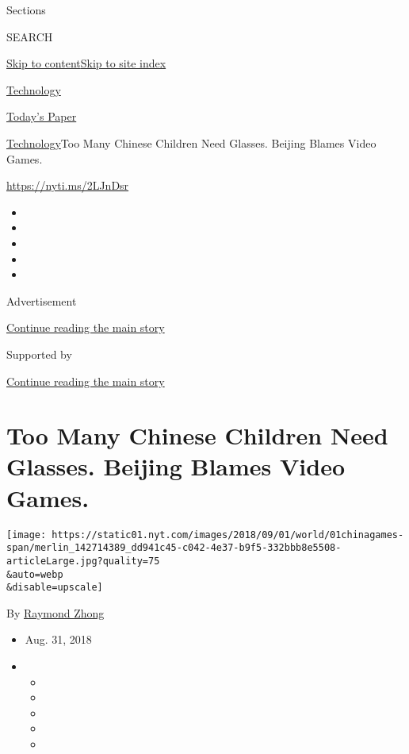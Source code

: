 Sections

SEARCH

\protect\hyperlink{site-content}{Skip to
content}\protect\hyperlink{site-index}{Skip to site index}

\href{https://www.nytimes.com/section/technology}{Technology}

\href{https://myaccount.nytimes.com/auth/login?response_type=cookie\&client_id=vi}{}

\href{https://www.nytimes.com/section/todayspaper}{Today's Paper}

\href{/section/technology}{Technology}\textbar{}Too Many Chinese
Children Need Glasses. Beijing Blames Video Games.

\url{https://nyti.ms/2LJnDsr}

\begin{itemize}
\item
\item
\item
\item
\item
\end{itemize}

Advertisement

\protect\hyperlink{after-top}{Continue reading the main story}

Supported by

\protect\hyperlink{after-sponsor}{Continue reading the main story}

\hypertarget{too-many-chinese-children-need-glasses-beijing-blames-video-games}{%
\section{Too Many Chinese Children Need Glasses. Beijing Blames Video
Games.}\label{too-many-chinese-children-need-glasses-beijing-blames-video-games}}

\texttt{[image: https://static01.nyt.com/images/2018/09/01/world/01chinagames-span/merlin\_142714389\_dd941c45-c042-4e37-b9f5-332bbb8e5508-articleLarge.jpg?quality=75\\\&auto=webp\\\&disable=upscale]}

By \href{https://www.nytimes.com/by/raymond-zhong}{Raymond Zhong}

\begin{itemize}
\item
  Aug. 31, 2018
\item
  \begin{itemize}
  \item
  \item
  \item
  \item
  \item
  \end{itemize}
\end{itemize}

